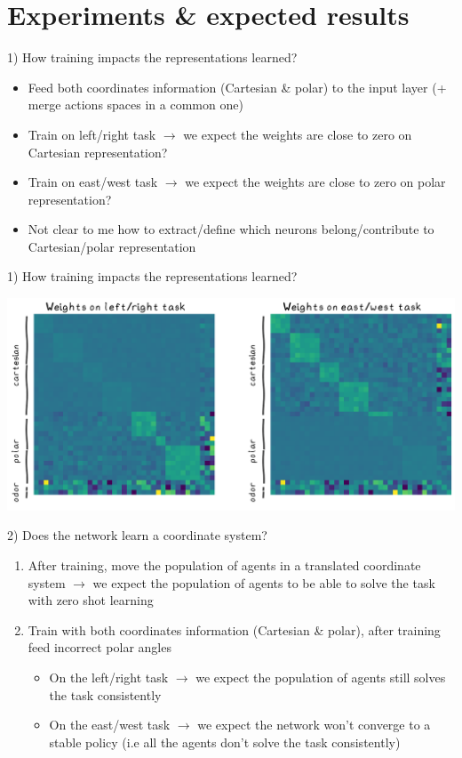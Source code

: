 \documentclass[bigger]{beamer}
\begin{document}
\section{Experiments \& expected results  }
\label{sec:org4be11b0}
\begin{frame}[<+->][label={sec:org1e29ec6}]{1) How training impacts the representations learned?}
\begin{itemize}
\item Feed both coordinates information (Cartesian \& polar) to the input layer (+ merge actions spaces in a common one)
\item Train on left/right task \(\to\) we expect the weights are close to zero on Cartesian representation?
\item Train on east/west task \(\to\) we expect the weights are close to zero on polar representation?
\item Not clear to me how to extract/define which neurons belong/contribute to Cartesian/polar representation
\end{itemize}
\end{frame}
\begin{frame}[label={sec:orgcf076ee}]{1) How training impacts the representations learned?}
\begin{center}
\includegraphics[width=.9\linewidth]{img/exp1-weights-heatmap.png}
\end{center}
\end{frame}
\begin{frame}[<+->][label={sec:orgdb1dafa}]{2) Does the network learn a coordinate system?}
\begin{enumerate}
\item After training, move the population of agents in a translated coordinate system
\(\to\) we expect the population of agents to be able to solve the task with zero shot learning
\item Train with both coordinates information (Cartesian \& polar), after training feed incorrect polar angles
\begin{itemize}
\item On the left/right task \(\to\) we expect the population of agents still solves the task consistently
\item On the east/west task \(\to\) we expect the network won't converge to a stable policy (i.e all the agents don't solve the task consistently)
\end{itemize}
\end{enumerate}
\end{frame}
\end{document}
